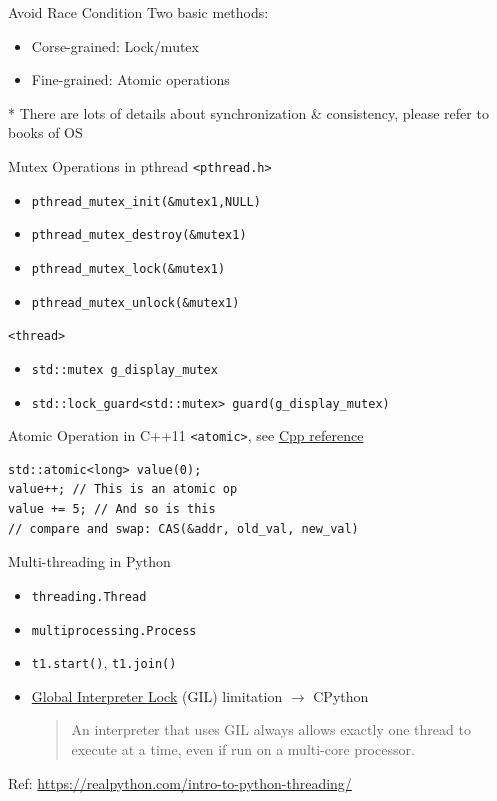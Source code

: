 \documentclass{../TexTemplate/myslide}
\begin{document}
\begin{frame}{Avoid Race Condition}
Two basic methods:
\begin{itemize}
	\item Corse-grained: Lock/mutex
	\item Fine-grained: Atomic operations
\end{itemize}
* There are lots of details about synchronization \& consistency, please refer to books of OS
\end{frame}

\begin{frame}[fragile]{Mutex Operations in pthread}
\verb'<pthread.h>'
\begin{itemize}
\item \verb'pthread_mutex_init(&mutex1,NULL)'
\item \verb'pthread_mutex_destroy(&mutex1)'
\item \verb'pthread_mutex_lock(&mutex1)'
\item \verb'pthread_mutex_unlock(&mutex1)'
\end{itemize}
\verb'<thread>'
\begin{itemize}
	\item \verb'std::mutex g_display_mutex'
	\item \verb'std::lock_guard<std::mutex> guard(g_display_mutex)'
\end{itemize}
\end{frame}

\begin{frame}[fragile]{Atomic Operation in C++11}
\verb'<atomic>', see \href{https://en.cppreference.com/w/cpp/atomic/atomic}{Cpp reference}
\begin{lstlisting}
std::atomic<long> value(0);
value++; // This is an atomic op
value += 5; // And so is this
// compare and swap: CAS(&addr, old_val, new_val)
\end{lstlisting}
\end{frame}

\begin{frame}[fragile]{Multi-threading in Python}
\begin{itemize}
	\item \verb'threading.Thread'
	\item \verb'multiprocessing.Process'
	\item \verb't1.start()', \verb't1.join()'
	\item \href{https://en.wikipedia.org/wiki/Global_interpreter_lock}{Global Interpreter Lock} (GIL) limitation $\to$ CPython
	\begin{quote}
	An interpreter that uses GIL always allows exactly one thread to execute at a time, even if run on a multi-core processor.
	\end{quote}
\end{itemize}
Ref: \url{https://realpython.com/intro-to-python-threading/}
\end{frame}
\end{document}
